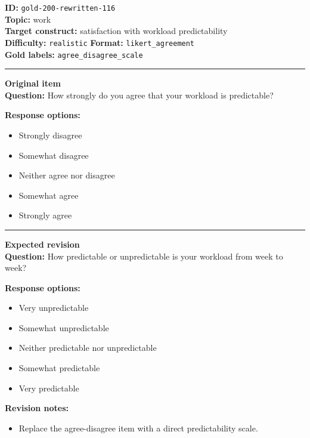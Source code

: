 \documentclass[10pt,a4paper]{article}
\newcommand{\sectionline}{\vspace{0.15em}\hrule\vspace{0.35em}}
\begin{document}
\begin{tcolorbox}[colframe=FlawRed,colback=white,colbacktitle=FlawRed!9,coltitle=black,title={Item 116\hfill Flawed item}]
\textbf{ID:} \texttt{gold-200-rewritten-116}\\
\textbf{Topic:} work\\
\textbf{Target construct:} satisfaction with workload predictability\\
\textbf{Difficulty:} \texttt{realistic} \quad \textbf{Format:} \texttt{likert\_agreement}\\
\textbf{Gold labels:} \texttt{agree\_disagree\_scale}\\
\sectionline
\textbf{Original item}\\
\textbf{Question:} How strongly do you agree that your workload is predictable?
\par\textbf{Response options:}
\begin{itemize}
\item Strongly disagree
\item Somewhat disagree
\item Neither agree nor disagree
\item Somewhat agree
\item Strongly agree
\end{itemize}
\sectionline
\textbf{Expected revision}\\
\textbf{Question:} How predictable or unpredictable is your workload from week to week?
\par\textbf{Response options:}
\begin{itemize}
\item Very unpredictable
\item Somewhat unpredictable
\item Neither predictable nor unpredictable
\item Somewhat predictable
\item Very predictable
\end{itemize}
\par\textbf{Revision notes:}
\begin{itemize}
\item Replace the agree-disagree item with a direct predictability scale.
\end{itemize}
\end{tcolorbox}
\end{document}
